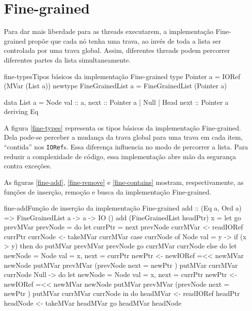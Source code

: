 \documentclass[a4paper,12pt,oldfontcommands]{abntex2}
\begin{document}
\section{Fine-grained}

Para dar mais liberdade para as threads executarem, a implementação Fine-grained propõe que cada nó tenha uma trava, ao invés de toda a lista ser controlada por uma trava global. Assim, diferentes threads podem percorrer diferentes partes da lista simultaneamente.

\begin{code}{fine-types}{Tipos básicos da implementação Fine-grained}
type Pointer a = IORef (MVar (List a))
newtype FineGrainedList a = FineGrainedList (Pointer a)

data List a = Node { val :: a, next :: Pointer a }
    | Null
    | Head { next :: Pointer a }
    deriving Eq
\end{code}

A figura \ref{fine-types} representa os tipos básicos da implementação Fine-grained. Dela pode-se perceber a mudança da trava global para uma trava em cada item, ``contida'' nos \texttt{IORef}s. Essa diferença influencia no modo de percorrer a lista. Para reduzir a complexidade de código, essa implementação abre mão da segurança contra exceções.

As figuras \ref{fine-add}, \ref{fine-remove} e \ref{fine-contains} mostram, respectivamente, as funções de inserção, remoção e busca da implementação Fine-grained.

\begin{code}{fine-add}{Função de inserção da implementação Fine-grained}
add :: (Eq a, Ord a) => FineGrainedList a -> a -> IO ()
add (FineGrainedList headPtr) x =
    let
        go prevMVar prevNode = do
            let currPtr = next prevNode
            currMVar <- readIORef currPtr
            currNode <- takeMVar currMVar
            case currNode of
                Node { val = y } ->
                    if (x > y) then do
                        putMVar prevMVar prevNode
                        go currMVar currNode
                    else do
                        let newNode = Node { val = x, next = currPtr }
                        newPtr <- newIORef =<< newMVar newNode
                        putMVar prevMVar (prevNode { next = newPtr })
                        putMVar currMVar currNode
                Null -> do
                    let newNode = Node { val = x, next = currPtr }
                    newPtr <- newIORef =<< newMVar newNode
                    putMVar prevMVar (prevNode { next = newPtr })
                    putMVar currMVar currNode
    in do
        headMVar <- readIORef headPtr
        headNode <- takeMVar headMVar
        go headMVar headNode
\end{code}
\end{document}
